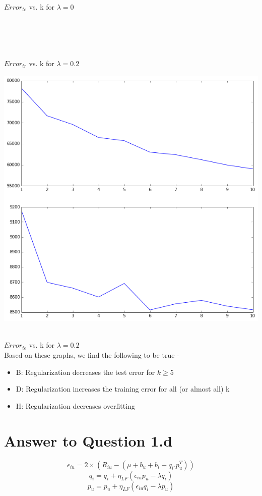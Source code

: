 \documentclass[11pt]{article}
\begin{document}
{$Error_{te}$ vs. k for $ \lambda = 0$\
\\\\\\\\\

$Error_{tr}$ vs. k for $ \lambda = 0.2$\

\includegraphics[scale=0.8]{q1errtrverrtel02}\

$Error_{te}$ vs. k for $ \lambda = 0.2$\\

Based on these graphs, we find the following to be true - 
\begin{itemize}
\item B: Regularization decreases the test error for $k \geq 5$
\item D: Regularization increases the training error for all (or almost all) k
\item H: Regularization decreases overfitting
\end{itemize}

\pagebreak[4]
\section*{Answer to Question 1.d}

$$\epsilon_{iu} = 2 \times (R_{iu} - (\mu + b_u + b_i + q_i . p_u^T))$$
$$q_i = q_i + \eta_{LF} ( \epsilon_{iu} p_u - \lambda q_i)$$
$$p_u= p_u + \eta_{LF} ( \epsilon_{iu} q_i - \lambda p_u)$$

}
\end{document}
